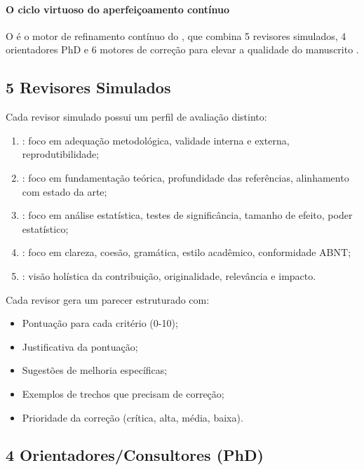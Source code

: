\paragraph{O ciclo virtuoso do aperfeiçoamento contínuo} O  é o motor de refinamento contínuo do
\opencodeeco{}, que combina 5 revisores simulados, 4 orientadores PhD e
6 motores de correção para elevar a qualidade do manuscrito
\cite{opencode2026ecosystem, opencode2026maswos}.

\subsection{5 Revisores Simulados}

Cada revisor simulado possui um perfil de avaliação distinto:

\begin{enumerate}
\item {}: foco em adequação metodológica,
      validade interna e externa, reprodutibilidade;
\item {}: foco em fundamentação teórica, profundidade
      das referências, alinhamento com estado da arte;
\item {}: foco em análise estatística, testes de
      significância, tamanho de efeito, poder estatístico;
\item {}: foco em clareza, coesão, gramática, estilo
      acadêmico, conformidade ABNT;
\item {}: visão holística da contribuição, originalidade,
      relevância e impacto.
\end{enumerate}

Cada revisor gera um parecer estruturado com:

\begin{itemize}
\item Pontuação para cada critério (0-10);
\item Justificativa da pontuação;
\item Sugestões de melhoria específicas;
\item Exemplos de trechos que precisam de correção;
\item Prioridade da correção (crítica, alta, média, baixa).
\end{itemize}

\subsection{4 Orientadores/Consultores (PhD)}

